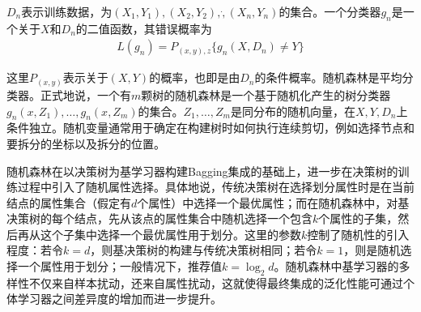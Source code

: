 \documentclass[supercite]{HustGraduPaper}
\begin{document}
\begin{sloppypar}
  $D_n$表示训练数据，为$(X_1,Y_1),(X_2,Y_2),\dot,(X_n,Y_n)$的集合。一个分类器$g_n$是一个关于$X$和$D_n$的二值函数，其错误概率为\begin{gather}
   L(g_n)=P_{(x,y),z}\{ g_n(X,D_n)\neq Y \}
  \end{gather}

  这里$P_{(x,y)}$表示关于$(X,Y)$的概率，也即是由$D_n$的条件概率。随机森林是平均分类器。正式地说，一个有$m$颗树的随机森林是一个基于随机化产生的树分类器$g_n(x,Z_1),\dots,g_n(x,Z_m)$的集合。$Z_1,\dots,Z_m$是同分布的随机向量，在$X,Y,D_n$上条件独立。随机变量通常用于确定在构建树时如何执行连续剪切，例如选择节点和要拆分的坐标以及拆分的位置。

  随机森林在以决策树为基学习器构建Bagging集成的基础上，进一步在决策树的训练过程中引入了随机属性选择。具体地说，传统决策树在选择划分属性时是在当前结点的属性集合（假定有$d$个属性）中选择一个最优属性；而在随机森林中，对基决策树的每个结点，先从该点的属性集合中随机选择一个包含$k$个属性的子集，然后再从这个子集中选择一个最优属性用于划分。这里的参数$k$控制了随机性的引入程度：若令$k=d$，则基决策树的构建与传统决策树相同；若令$k=1$，则是随机选择一个属性用于划分；一般情况下，推荐值$k=\log_2d$。随机森林中基学习器的多样性不仅来自样本扰动，还来自属性扰动，这就使得最终集成的泛化性能可通过个体学习器之间差异度的增加而进一步提升。

\end{sloppypar}
\end{document}
